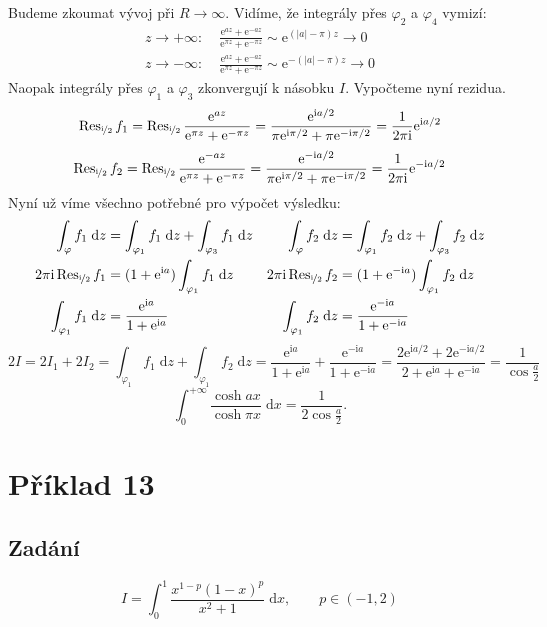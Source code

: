 \documentclass[10pt,a4paper]{article}
\newcommand{\const}[1]{\text{#1}}
\newcommand{\Res}{\operatorname{Res}}
\renewcommand{\d}[1]{\;\const{d}#1}
\newcommand{\e}[1]{\const{e}^{#1}}
\renewcommand{\i}{\const{i}}
\begin{document}
Budeme zkoumat vývoj při $R \to \infty$. Vidíme, že integrály přes $\varphi_2$ a $\varphi_4$ vymizí:
\begin{align*}
    z \to +\infty: \; &\frac{\e{az} + \e{-az}}{\e{\pi z} + \e{-\pi z}}
    \sim \e{(|a|-\pi)z} \to 0
    \\
    z \to -\infty: \; &\frac{\e{az} + \e{-az}}{\e{\pi z} + \e{-\pi z}}
    \sim \e{-(|a|-\pi)z} \to 0
\end{align*}
Naopak integrály přes $\varphi_1$ a $\varphi_3$ zkonvergují k násobku $I$. Vypočteme nyní rezidua.
\begin{equation*}
    \Res_{\nicefrac{\i}{2}} f_1
    = \Res_{\nicefrac{\i}{2}} \frac{\e{az}}{\e{\pi z} + \e{-\pi z}}
    = \frac{\e{\i a/2}}{\pi\e{\i\pi/2} + \pi\e{-\i\pi/2}}
    = \frac{1}{2\pi\i} \e{\i a/2}
\end{equation*}
\begin{equation*}
    \Res_{\nicefrac{\i}{2}} f_2
    = \Res_{\nicefrac{\i}{2}} \frac{\e{-az}}{\e{\pi z} + \e{-\pi z}}
    = \frac{\e{-\i a/2}}{\pi\e{\i\pi/2} + \pi\e{-\i\pi/2}}
    = \frac{1}{2\pi\i} \e{-\i a/2}
\end{equation*}
Nyní už víme všechno potřebné pro výpočet výsledku:
\begin{align*}
    \int_\varphi f_1 \d{z}
    &= \int_{\varphi_1} f_1 \d{z} + \int_{\varphi_3} f_1 \d{z}
    &
    \int_\varphi f_2 \d{z}
    &= \int_{\varphi_1} f_2 \d{z} + \int_{\varphi_3} f_2 \d{z}
    \\
    2\pi\i \Res_{\nicefrac{\i}{2}} f_1
    &= (1+\e{\i a}) \int_{\varphi_1} f_1 \d{z}
    &
    2\pi\i \Res_{\nicefrac{\i}{2}} f_2
    &= (1+\e{-\i a}) \int_{\varphi_1} f_2 \d{z}
    \\
    \int_{\varphi_1} f_1 \d{z}
    &= \frac{\e{\i a}}{1+\e{\i a}}
    &
    \int_{\varphi_1} f_2 \d{z}
    &= \frac{\e{-\i a}}{1+\e{-\i a}}
\end{align*}
\begin{equation*}
    2I = 2I_1 + 2I_2
    = \int_{\varphi_1} f_1 \d{z} + \int_{\varphi_1} f_2 \d{z}
    = \frac{\e{\i a}}{1+\e{\i a}} + \frac{\e{-\i a}}{1+\e{-\i a}}
    = \frac{2\e{\i a/2} + 2\e{-\i a/2}}{2 + \e{\i a} + \e{-\i a}}
    = \frac{1}{\cos \frac{a}{2}}
\end{equation*}
\bigskip
\begin{equation*}
    \int_0^{+\infty}\frac{\cosh ax}{\cosh \pi x} \d{x} = \frac{1}{2 \cos \frac{a}{2}}.
\end{equation*}

\pagebreak

\section{Příklad 13}
\subsection{Zadání}
\begin{equation*}
    I = \int_0^1 \frac{x^{1-p} (1-x)^p}{x^2+1} \d{x},
    \hspace{2em}
    p \in (-1, 2)
\end{equation*}
\end{document}
